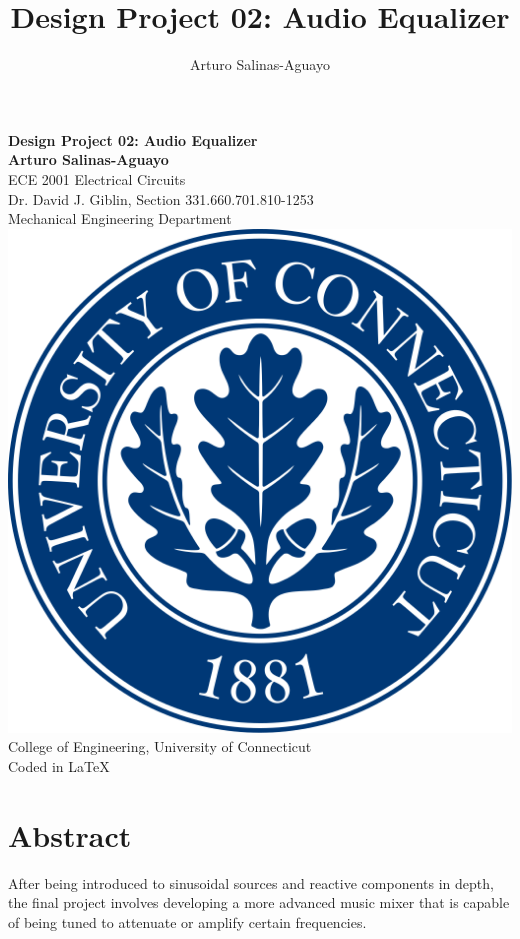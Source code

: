 \documentclass[12pt]{article}
\author{Arturo Salinas-Aguayo}
\title{Design Project 02: Audio Equalizer}
\begin{document}
\newcommand{\closure}[2][3]{%
	{}\mkern#1mu\overline{\mkern-#1mu#2}}
\newcommand\ncoverline[1]{\mkern1mu\overline{\mkern-1mu#1\mkern-1mu}\mkern1mu}
\begin{titlepage}
	\centering
	\vspace*{3cm}
	\huge\textbf{Design Project 02: Audio Equalizer}\\

	\vspace{5cm}
	\Large\textbf{Arturo Salinas-Aguayo}\\
	\normalsize
	ECE 2001 Electrical Circuits\\
	Dr. David J. Giblin, Section 331.660.701.810-1253\\
	Mechanical Engineering Department
	\vfill
	\includegraphics[scale=0.1]{uconnlogo}\\
	College of Engineering, University of Connecticut\\
	\scriptsize{Coded in \LaTeX}
	\vspace*{1cm}
\end{titlepage}
\tableofcontents
\newpage

\section{Abstract}
After being introduced to sinusoidal sources and reactive components in depth, the final project involves developing a more advanced music mixer that is capable of being tuned to attenuate or amplify certain frequencies.
\end{document}
